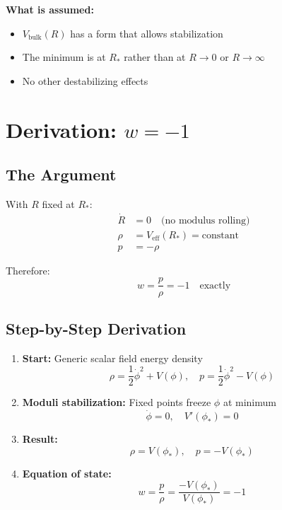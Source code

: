 \documentclass[12pt,a4paper]{article}
\begin{document}
\textbf{What is assumed:}
\begin{itemize}
    \item $V_{\text{bulk}}(R)$ has a form that allows stabilization
    \item The minimum is at $R_*$ rather than at $R \to 0$ or $R \to \infty$
    \item No other destabilizing effects
\end{itemize}

\section{Derivation: $w = -1$}

\subsection{The Argument}

With $R$ fixed at $R_*$:
\begin{align}
\dot{R} &= 0 \quad \text{(no modulus rolling)} \\
\rho &= V_{\text{eff}}(R_*) = \text{constant} \\
p &= -\rho
\end{align}

Therefore:
\begin{equation}
\boxed{w = \frac{p}{\rho} = -1 \quad \text{exactly}}
\end{equation}

\subsection{Step-by-Step Derivation}

\begin{enumerate}
    \item \textbf{Start:} Generic scalar field energy density
    \begin{equation}
    \rho = \frac{1}{2}\dot{\phi}^2 + V(\phi), \quad p = \frac{1}{2}\dot{\phi}^2 - V(\phi)
    \end{equation}

    \item \textbf{Moduli stabilization:} Fixed points freeze $\phi$ at minimum
    \begin{equation}
    \dot{\phi} = 0, \quad V'(\phi_*) = 0
    \end{equation}

    \item \textbf{Result:}
    \begin{equation}
    \rho = V(\phi_*), \quad p = -V(\phi_*)
    \end{equation}

    \item \textbf{Equation of state:}
    \begin{equation}
    w = \frac{p}{\rho} = \frac{-V(\phi_*)}{V(\phi_*)} = -1
    \end{equation}
\end{enumerate}
\end{document}

